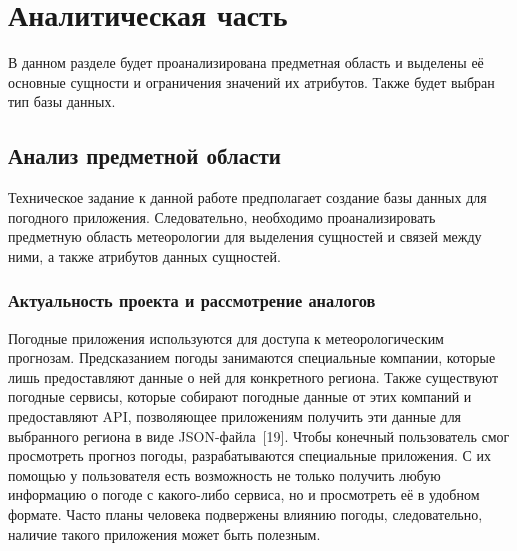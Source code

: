 \chapter{Аналитическая часть}

В данном разделе будет проанализирована предметная область и выделены её основные сущности и ограничения значений их атрибутов.
Также будет выбран тип базы данных.

\section{Анализ предметной области}

Техническое задание к данной работе предполагает создание базы данных для погодного приложения.
Следовательно, необходимо проанализировать предметную область метеорологии для выделения сущностей и связей между ними, а также атрибутов данных сущностей.

\subsection{Актуальность проекта и рассмотрение аналогов}
Погодные приложения используются для доступа к метеорологическим прогнозам.
Предсказанием погоды занимаются специальные компании, которые лишь предоставляют данные о ней для конкретного региона.
Также существуют погодные сервисы, которые собирают погодные данные от этих компаний и предоставляют API, позволяющее приложениям получить эти данные для выбранного региона в виде JSON-файла~[19].
Чтобы конечный пользователь смог просмотреть прогноз погоды, разрабатываются специальные приложения.
С их помощью у пользователя есть возможность не только получить любую информацию о погоде с какого-либо сервиса, но и просмотреть её в удобном формате.
Часто планы человека подвержены влиянию погоды, следовательно, наличие такого приложения может быть полезным.

